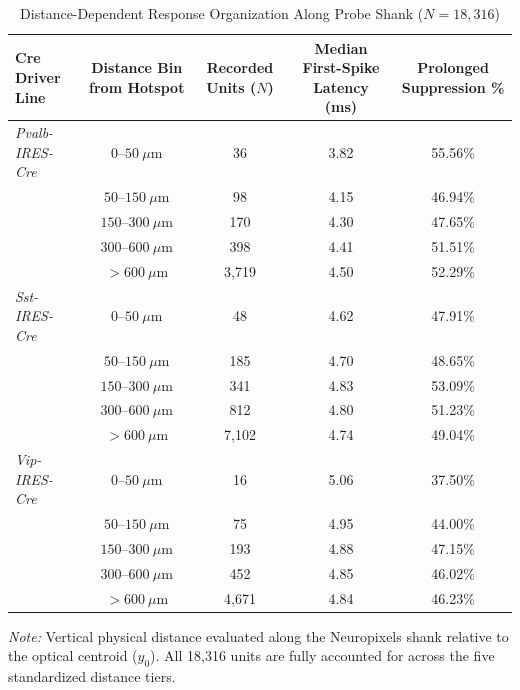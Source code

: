 \documentclass[10pt,journal,compsoc]{IEEEtran}
\begin{document}
\begin{table}[t]
\caption{Distance-Dependent Response Organization Along Probe Shank ($N=18,316$)}
\label{tab:spatial}
\centering
\small
\setlength{\tabcolsep}{8pt}
\begin{tabular*}{\textwidth}{@{\extracolsep{\fill}}lcccc@{}}
\toprule
\textbf{Cre Driver Line} & \textbf{Distance Bin from Hotspot} & \textbf{Recorded Units ($N$)} & \textbf{Median First-Spike Latency (ms)} & \textbf{Prolonged Suppression \%} \\
\midrule
\textit{Pvalb-IRES-Cre} & $0–50\ \mu\text{m}$    & 36    & 3.82 & 55.56\% \\
                        & $50–150\ \mu\text{m}$  & 98    & 4.15 & 46.94\% \\
                        & $150–300\ \mu\text{m}$ & 170   & 4.30 & 47.65\% \\
                        & $300–600\ \mu\text{m}$ & 398   & 4.41 & 51.51\% \\
                        & $>600\ \mu\text{m}$    & 3,719 & 4.50 & 52.29\% \\
\midrule
\textit{Sst-IRES-Cre}   & $0–50\ \mu\text{m}$    & 48    & 4.62 & 47.91\% \\
                        & $50–150\ \mu\text{m}$  & 185   & 4.70 & 48.65\% \\
                        & $150–300\ \mu\text{m}$ & 341   & 4.83 & 53.09\% \\
                        & $300–600\ \mu\text{m}$ & 812   & 4.80 & 51.23\% \\
                        & $>600\ \mu\text{m}$    & 7,102 & 4.74 & 49.04\% \\
\midrule
\textit{Vip-IRES-Cre}   & $0–50\ \mu\text{m}$    & 16    & 5.06 & 37.50\% \\
                        & $50–150\ \mu\text{m}$  & 75    & 4.95 & 44.00\% \\
                        & $150–300\ \mu\text{m}$ & 193   & 4.88 & 47.15\% \\
                        & $300–600\ \mu\text{m}$ & 452   & 4.85 & 46.02\% \\
                        & $>600\ \mu\text{m}$    & 4,671 & 4.84 & 46.23\% \\
\bottomrule
\end{tabular*}
\vspace{1mm}
\parbox{\textwidth}{\footnotesize \textit{Note:} Vertical physical distance evaluated along the Neuropixels shank relative to the optical centroid ($y_0$). All 18,316 units are fully accounted for across the five standardized distance tiers.}
\end{table}
\end{document}
